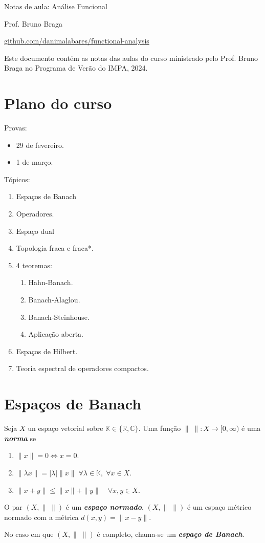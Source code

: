 \documentclass[portuguese]{article}
\theoremstyle{definition}
\newcommand{\R}{\mathbb{R}}
\newcommand{\C}{\mathbb{C}}
\begin{document}
	\begin{center}
		{\LARGE Notas de aula: Análise Funcional}
		
		{\Large Prof. Bruno Braga}
		
		 \href{https://github.com/danimalabares/functional-analysis}{github.com/danimalabares/functional-analysis}
		
	\end{center}
	Este documento contém as notas das aulas do curso ministrado pelo Prof. Bruno Braga no Programa de Verão do IMPA, 2024.
	\tableofcontents
	\section*{Plano do curso}
	Provas:
	\begin{itemize}
		\item 29 de fevereiro.
		\item 1 de março.
	\end{itemize}
	Tópicos:
	\begin{enumerate}
		\item Espaços de Banach
		\item Operadores.
		\item Espaço dual
		\item Topologia fraca e fraca*.
		\item 4 teoremas:
		\begin{enumerate}
			\item Hahn-Banach.
			\item Banach-Alaglou.
			\item Banach-Steinhouse.
			\item Aplicação aberta.
		\end{enumerate}
		\item Espaços de Hilbert.
		\item Teoria espectral de operadores compactos.
	\end{enumerate}
	
	\section{Espaços de Banach}
	\begin{defn}
		Seja $X$ un espaço vetorial sobre $\mathbb{K}\in\{\R,\C\}$. Uma função $\|\; \|:X\to[0,\infty)$ é uma \textbf{\textit{norma}} se
		\begin{enumerate}
			\item $\| x\|=0\iff x=0$.
			\item $\|\lambda x\|=|\lambda|\| x\|\;\forall\lambda\in\mathbb{K},\;\forall x\in X$.
			\item $\| x+y\|\leq\| x\|+\| y\|\quad\forall x,y\in X$.
		\end{enumerate}
		O par $(X,\|\;\|)$ é um \textbf{\textit{espaço normado}}. $(X,\|\;\|)$ é um espaço métrico normado com a métrica $d(x,y)=\| x-y\|$.
		
		No caso em que $(X,\|\;\|)$ é completo, chama-se um \textbf{\textit{espaço de Banach}}.
	\end{defn}
	
\end{document}
